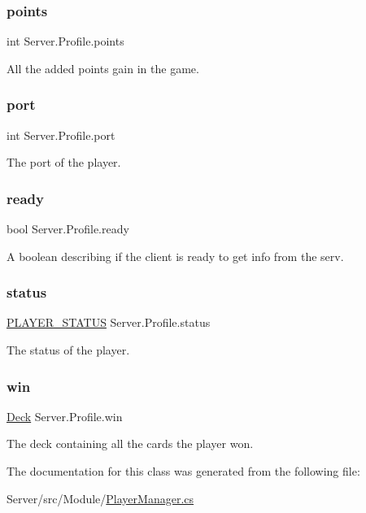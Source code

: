 \subsubsection{\texorpdfstring{points}{points}}
{\footnotesize\ttfamily int Server.\+Profile.\+points}

All the added points gain in the game. \mbox{\label{class_server_1_1_profile_a874fcf418204b40c14a66169e7651ef3}} 
\subsubsection{\texorpdfstring{port}{port}}
{\footnotesize\ttfamily int Server.\+Profile.\+port}

The port of the player. \mbox{\label{class_server_1_1_profile_a4c774c7861a97447f29e51cc58d79df2}} 
\subsubsection{\texorpdfstring{ready}{ready}}
{\footnotesize\ttfamily bool Server.\+Profile.\+ready}

A boolean describing if the client is ready to get info from the serv. \mbox{\label{class_server_1_1_profile_ab4e81f19ca7f09df48bbf54bf3cd37ed}} 
\subsubsection{\texorpdfstring{status}{status}}
{\footnotesize\ttfamily \hyperlink{_player_manager_8cs_ad4fb168881776778ff2e0f659212a0da}{P\+L\+A\+Y\+E\+R\+\_\+\+S\+T\+A\+T\+US} Server.\+Profile.\+status}

The status of the player. \mbox{\label{class_server_1_1_profile_a6ea89928248a56c2d602e736aa00af00}} 
\subsubsection{\texorpdfstring{win}{win}}
{\footnotesize\ttfamily \hyperlink{class_game_1_1_deck}{Deck} Server.\+Profile.\+win}

The deck containing all the cards the player won. 

The documentation for this class was generated from the following file\+:\begin{DoxyCompactItemize}
\item 
Server/src/\+Module/\hyperlink{_player_manager_8cs}{Player\+Manager.\+cs}\end{DoxyCompactItemize}
